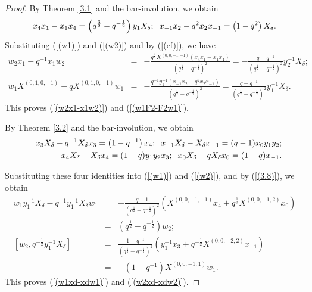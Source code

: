 \documentclass[reqno,11pt]{amsart}
\numberwithin{equation}{section}
\begin{document}
\begin{proof}
 By Theorem \ref{3.1} and the bar-involution, we obtain
\begin{eqnarray*}
	x_4 x_1-x_1 x_4  =\left(q^{\frac{3}{2}}-q^{-\frac{1}{2}}\right) y_1 X_\delta; \hspace{0.2cm}
	x_{-1} x_2-q^2 x_2 x_{-1}  =\left(1-q^2\right) X_\delta .
\end{eqnarray*}
 Substituting (\ref{(w1)}) and (\ref{(w2)}) and by (\ref{(ef)}), we have
\begin{eqnarray*}
	w_2 x_1-q^{-1} x_1 w_2 & =&-\frac{q^{\frac{1}{2}} X^{(0,0,-1,-1)}\left(x_4 x_1-x_1 x_4\right)}{\left(q^{\frac{1}{2}}-q^{-\frac{1}{2}}\right)^2}=-\frac{q-q^{-1}}{\left(q^{\frac{1}{2}}-q^{-\frac{1}{2}}\right)^2} y_2^{-1} X_\delta; \\
	w_1 X^{(0,1,0,-1)}-q X^{(0,1,0,-1)} w_1 & =&-\frac{q^{-1} y_1^{-1}\left(x_{-1} x_2-q^2 x_2 x_{-1}\right)}{\left(q^{\frac{1}{2}}-q^{-\frac{1}{2}}\right)^2}=\frac{q-q^{-1}}{\left(q^{\frac{1}{2}}-q^{-\frac{1}{2}}\right)^2} y_1^{-1} X_\delta .
\end{eqnarray*}
This proves (\ref{(w2x1-x1w2)}) and (\ref{(w1F2-F2w1)}).

By Theorem \ref{3.2} and the bar-involution, we obtain
\begin{eqnarray*}
&&x_3 X_\delta-q^{-1} X_\delta x_3  =\left(1-q^{-1}\right) x_4;\hspace{0.2cm}
	x_{-1} X_\delta-X_\delta x_{-1}  =(q-1) x_0 y_1 y_2; \\
&&	x_4 X_\delta-X_\delta x_4  =(1-q) y_1 y_2 x_3;\hspace{0.2cm}
	x_0 X_\delta-q X_\delta x_0  =(1-q) x_{-1} .
\end{eqnarray*}

Substituting these four identities into (\ref{(w1)}) and (\ref{(w2)}), and by (\ref{(3.8)}), we obtain
\begin{eqnarray*}
	w_1 y_1^{-1} X_\delta-q^{-1} y_1^{-1} X_\delta w_1 & =&-\frac{q-1}{\left(q^{\frac{1}{2}}-q^{-\frac{1}{2}}\right)^2}\left(X^{(0,0,-1,-1)} x_4+q^{\frac{1}{2}} X^{(0,0,-1,2)} x_0\right) \\
	& =&\left(q^{\frac{1}{2}}-q^{-\frac{1}{2}}\right) w_2;\\
	{\left[w_2, q^{-\frac{1}{2}} y_1^{-1} X_\delta\right] } & =&\frac{1-q^{-1}}{\left(q^{\frac{1}{2}}-q^{-\frac{1}{2}}\right)^2}\left(y_1^{-1} x_3+q^{-\frac{1}{2}} X^{(0,0,-2,2)} x_{-1}\right) \\
	& =&-\left(1-q^{-1}\right) X^{(0,0,-1,1)} w_1 .
\end{eqnarray*}
This proves (\ref{(w1xd-xdw1)}) and (\ref{(w2xd-xdw2)}).	
	

\end{proof}
\end{document}
